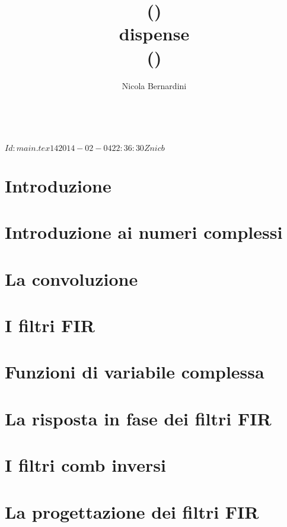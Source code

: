 \documentclass{scrbook}
\title{%
	\topic (\topicacro) \level\\dispense\\{\tiny (\rcstag)}%
}
\author{Nicola Bernardini\\[2cm]\license}
\date{~}
\begin{document}
\svnInfo $Id: main.tex 14 2014-02-04 22:36:30Z nicb $

\maketitle

\tableofcontents

\chapter{Introduzione\label{chap:introduction}}



\chapter{Introduzione ai numeri complessi\label{chap:complex numbers}}



\chapter{La convoluzione\label{chap:convolution}}



\chapter{I filtri FIR\label{chap:fir}}



\chapter{Funzioni di variabile complessa\label{chap:complex variable functions}}



\chapter{La risposta in fase dei filtri FIR\label{chap:FIR phase response}}



\chapter{I filtri comb inversi\label{chap:icf}}


\chapter{La progettazione dei filtri FIR\label{chap:filter design}}



% 



\end{document}
